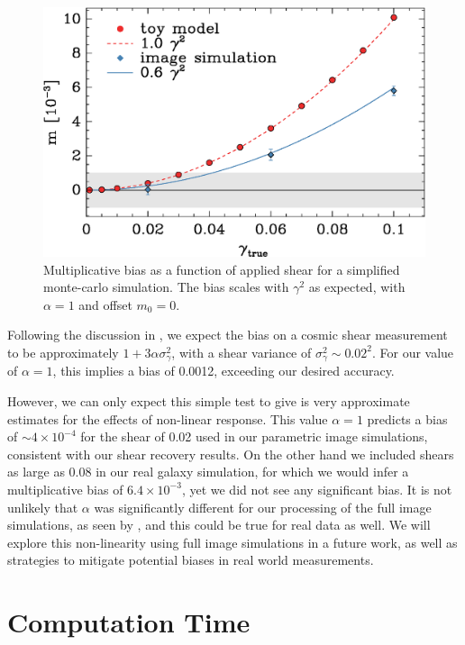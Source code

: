 \documentclass[iop]{emulateapj}
\begin{document}
\begin{figure}
	\centering
    \includegraphics[width=\columnwidth]{weaklens-approx.eps}

	\caption{Multiplicative bias as a function of applied shear for a
	simplified monte-carlo simulation.  The bias scales with $\gamma^2$
	as expected, with $\alpha=1$ and offset $m_0=0$.}

\label{fig:weaklens}
\end{figure}

Following the discussion in \cite{bfd2016}, we expect the bias on a cosmic
shear measurement to be approximately $1 + 3\alpha\sigma_\gamma^2$, with a
shear variance of $\sigma_\gamma^2 \sim 0.02^2$.  For our value of $\alpha=1$,
this implies a bias of 0.0012, exceeding our desired accuracy.

However, we can only expect this simple test to give is very approximate estimates
for the effects of non-linear response.  This value $\alpha=1$ predicts a bias
of $\sim 4 \times 10^{-4}$ for the shear of 0.02 used in our parametric image
simulations, consistent with our shear recovery results.  On the other hand we
included shears as large as 0.08 in our real galaxy simulation, for which we
would infer a multiplicative bias of $6.4 \times 10^{-3}$, yet we did not see
any significant bias.  It is not unlikely that $\alpha$ was significantly
different for our processing of the full image simulations, as seen by
\cite{bfd2016}, and this could be true for real data as well.  We will
explore this non-linearity using full image simulations in a future work,
as well as strategies to mitigate potential biases in real world
measurements.


\section{Computation Time}
\end{document}
